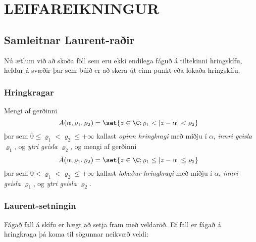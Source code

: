 \chapter {LEIFAREIKNINGUR}
 

\section{Samleitnar Laurent-raðir}  

Nú ætlum við að skoða föll sem eru ekki endilega fáguð á tiltekinni
hringskífu, heldur á svæðir þar sem búið er að skera út einn punkt
eða lokaða hringskífu.

\subsection*{Hringkragar}

Mengi af gerðinni 
$$A(\alpha,\varrho_1,\varrho_2)=\set{z\in \C;
\varrho_1<|z-\alpha|<\varrho_2}
$$ 
þar sem
$0\leq\varrho_1<\varrho_2\leq +\infty$
kallast {\it opinn hringkragi
}
með miðju í $\alpha$, {\it innri geisla}
$\varrho_1$, og {\it ytri geisla $\varrho_2$},
og mengi af gerðinni 
$$\bar A(\alpha,\varrho_1,\varrho_2)=\set{z\in \C;
\varrho_1\leq|z-\alpha|\leq\varrho_2}
$$ þar sem
$0<\varrho_1<\varrho_2\leq +\infty$
kallast {\it lokaður hringkragi} með miðju í $\alpha$, {\it innri geisla}
$\varrho_1$, og {\it ytri geisla $\varrho_2$}.


\subsection*{Laurent-setningin}
 
Fágað fall á skífu er hægt að setja fram með veldaröð.  
Ef fall er fágað á hringkraga þá koma til sögunnar neikvæð veldi:

